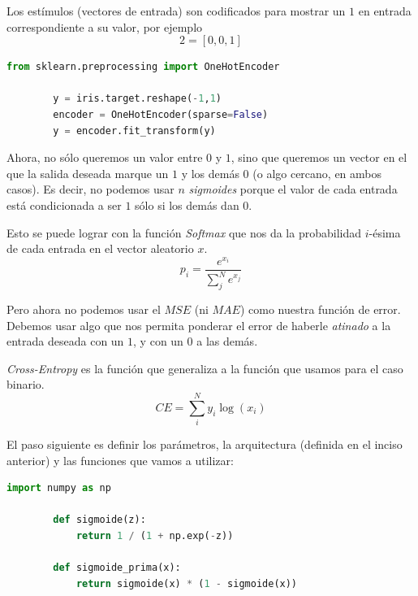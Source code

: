 \documentclass[letterpaper,11pt]{article}
\begin{document}
\begin{enumerate}
\begin{enumerate}
        Los estímulos (vectores de entrada) son codificados para mostrar un $1$
        en entrada correspondiente a su valor, por ejemplo
        \begin{equation*}
            2 = [0, 0, 1]
        \end{equation*}

        \newpage
        \begin{lstlisting}[language=Python]
        from sklearn.preprocessing import OneHotEncoder

        y = iris.target.reshape(-1,1)
        encoder = OneHotEncoder(sparse=False)
        y = encoder.fit_transform(y)
        \end{lstlisting}

        Ahora, no sólo queremos un valor entre $0$ y $1$, sino que queremos un 
        vector en el que la salida deseada marque un $1$ y los demás $0$ (o 
        algo cercano, en ambos casos). Es decir, no podemos usar $n$ 
        \textit{sigmoides} porque el valor de cada entrada está condicionada a
        ser $1$ sólo si los demás dan $0$.

        Esto se puede lograr con la función \textit{Softmax} que nos da la 
        probabilidad $i$-ésima de cada entrada en el vector aleatorio $x$.
        \begin{equation*}
            p_i = \frac{e^{x_i}}{\sum_{j}^{N} e^{x_j}}
        \end{equation*}

        Pero ahora no podemos usar el $MSE$ (ni $MAE$) como nuestra función de 
        error. Debemos usar algo que nos permita ponderar el error de haberle
        \textit{atinado} a la entrada deseada con un $1$, y con un $0$ a las 
        demás.

        \textit{Cross-Entropy} es la función que generaliza a la función que 
        usamos para el caso binario.
        \begin{equation*}
            CE = \sum_{i}^{N} y_i \log (x_i)
        \end{equation*}

        El paso siguiente es definir los parámetros, la arquitectura (definida 
        en el inciso anterior) y las funciones que vamos a utilizar:
        \begin{lstlisting}[language=Python]
        import numpy as np

        def sigmoide(z):
            return 1 / (1 + np.exp(-z))

        def sigmoide_prima(x):
            return sigmoide(x) * (1 - sigmoide(x))


\end{lstlisting}
\end{enumerate}
\end{enumerate}
\end{document}
